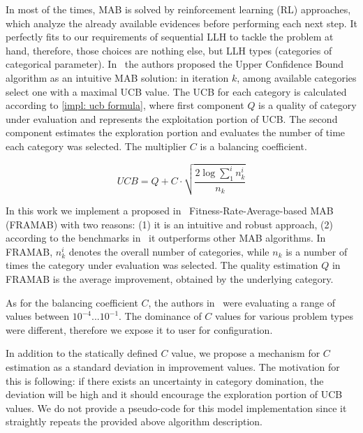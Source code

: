 In most of the times, MAB is solved by reinforcement learning (RL) approaches, which analyze the already available evidences before performing each next step. It perfectly fits to our requirements of sequential LLH to tackle the problem at hand, therefore, those choices are nothing else, but LLH types (categories of categorical parameter). In~\cite{auer2002finite} the authors proposed the Upper Confidence Bound algorithm as an intuitive MAB solution: in iteration $k$, among available categories select one with a maximal UCB value. The UCB for each category is calculated according to \cref{impl: ucb formula}, where first component $Q$ is a quality of category under evaluation and represents the exploitation portion of UCB. The second component estimates the exploration portion and evaluates the number of time each category was selected. The multiplier $C$ is a balancing coefficient.

\begin{equation}
UCB = Q + C \cdot \sqrt{\frac{2 \log \sum_{1}^{i} n_k^i}{n_k}}
\label{impl: ucb formula}
\end{equation}

In this work we implement a proposed in~\cite{li2013adaptive} Fitness-Rate-Average-based MAB (FRAMAB) with two reasons: (1) it is an intuitive and robust approach, (2) according to the benchmarks in~\cite{ferreira2017multi} it outperforms other MAB algorithms. In FRAMAB, $n_k^i$ denotes the overall number of categories, while $n_k$ is a number of times the category under evaluation was selected. The quality estimation $Q$ in FRAMAB is the average improvement, obtained by the underlying category.

As for the balancing coefficient $C$, the authors in~\cite{ferreira2017multi} were evaluating a range of values between $10^{-4}...10^{-1}$. The dominance of $C$ values for various problem types were different, therefore we expose it to user for configuration. 

In addition to the statically defined $C$ value, we propose a mechanism for $C$ estimation as a standard deviation in improvement values. The motivation for this is following: if there exists an uncertainty in category domination, the deviation will be high and it should encourage the exploration portion of UCB values. We do not provide a pseudo-code for this model implementation since it straightly repeats the provided above algorithm description.


